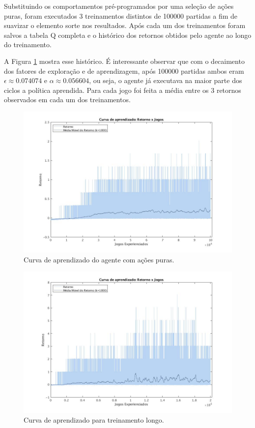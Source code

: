 Substituindo os comportamentos pré-programados por uma seleção de ações puras, foram executados 3 treinamentos distintos de 100000 partidas a fim de suavizar o elemento sorte nos resultados. Após cada um dos treinamentos foram salvos a tabela Q completa e o histórico dos retornos obtidos pelo agente ao longo do treinamento.

A Figura \ref{fig:single-agent-curva} mostra esse histórico. É interessante observar que com o decaimento dos fatores de exploração e de aprendizagem, após 100000 partidas ambos eram $\epsilon \approx 0.074074$ e $\alpha \approx 0.056604$, ou seja, o agente já executava na maior parte dos ciclos a política aprendida. Para cada jogo foi feita a média entre os 3 retornos observados em cada um dos treinamentos.

\begin{figure}[H]
	\includegraphics[width=0.93\linewidth]{figs/curva-qtabular.jpg}
	\centering
	\caption{Curva de aprendizado do agente com ações puras. }
	\label{fig:single-agent-curva}
\end{figure}

\begin{figure}[H]
	\includegraphics[width=0.93\linewidth]{figs/curvalonga-qtabular.jpg}
	\centering
	\caption{Curva de aprendizado para treinamento longo.}
	\label{fig:single-agent-curvalonga}
\end{figure}

